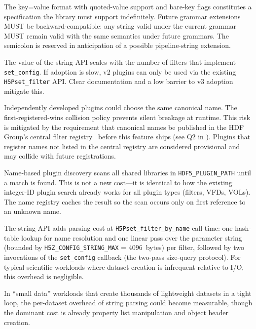\documentclass[../HDF5_RFC.tex]{subfiles}
\begin{document}
The key=value format with quoted-value support and
bare-key flags constitutes a specification the library must support
indefinitely. Future grammar extensions MUST be backward-compatible: any
string valid under the current grammar MUST remain valid with the same
semantics under future grammars. The semicolon is reserved in anticipation of
a possible pipeline-string extension.

The value of the string API scales with the number of
filters that implement \texttt{set\_config}. If adoption is slow, v2 plugins can only
be used via the existing \texttt{H5Pset\_filter} API. Clear documentation and a low
barrier to v3 adoption mitigate this.

Independently developed plugins could choose the same
canonical name. The first-registered-wins collision policy prevents silent
breakage at runtime. This risk is mitigated by the requirement that canonical
names be published in the HDF Group's central filter
registry~\cite{hdf5registeredfilters} before this feature ships (see Q2 in
). Plugins that register names not listed in the
central registry are considered provisional and may collide with future
registrations.

Name-based plugin discovery scans all shared libraries
in \texttt{HDF5\_PLUGIN\_PATH} until a match is found. This is not a new cost---it
is identical to how the existing integer-ID plugin search already works for
all plugin types (filters, VFDs, VOLs). The name registry caches the result
so the scan occurs only on first reference to an unknown name.

The string API adds parsing cost at \texttt{H5Pset\_filter\_by\_name} call time:
one hash-table lookup for name resolution and one linear pass over the
parameter string (bounded by \texttt{H5Z\_CONFIG\_STRING\_MAX} = 4096~bytes) per
filter, followed by two invocations of the \texttt{set\_config} callback (the
two-pass size-query protocol). For typical scientific workloads where dataset
creation is infrequent relative to I/O, this overhead is negligible.

In ``small data'' workloads that create thousands of lightweight datasets in a
tight loop, the per-dataset overhead of string parsing could become measurable,
though the dominant cost is already property list manipulation and object header
creation.
\end{document}
